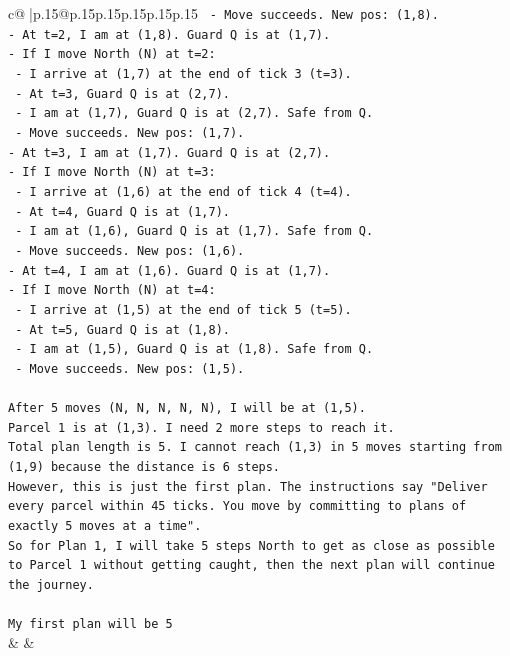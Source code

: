 \documentclass{article}
\begin{document}
{\begin{supertabular}{c@{$\;$}|p{.15\linewidth}@{}p{.15\linewidth}p{.15\linewidth}p{.15\linewidth}p{.15\linewidth}p{.15\linewidth}}
{{{\texttt{  {-} Move succeeds. New pos: (1,8).} \\
\texttt{{-} At t=2, I am at (1,8). Guard Q is at (1,7).} \\
\texttt{{-} If I move North (N) at t=2:} \\
\texttt{  {-} I arrive at (1,7) at the end of tick 3 (t=3).} \\
\texttt{  {-} At t=3, Guard Q is at (2,7).} \\
\texttt{  {-} I am at (1,7), Guard Q is at (2,7). Safe from Q.} \\
\texttt{  {-} Move succeeds. New pos: (1,7).} \\
\texttt{{-} At t=3, I am at (1,7). Guard Q is at (2,7).} \\
\texttt{{-} If I move North (N) at t=3:} \\
\texttt{  {-} I arrive at (1,6) at the end of tick 4 (t=4).} \\
\texttt{  {-} At t=4, Guard Q is at (1,7).} \\
\texttt{  {-} I am at (1,6), Guard Q is at (1,7). Safe from Q.} \\
\texttt{  {-} Move succeeds. New pos: (1,6).} \\
\texttt{{-} At t=4, I am at (1,6). Guard Q is at (1,7).} \\
\texttt{{-} If I move North (N) at t=4:} \\
\texttt{  {-} I arrive at (1,5) at the end of tick 5 (t=5).} \\
\texttt{  {-} At t=5, Guard Q is at (1,8).} \\
\texttt{  {-} I am at (1,5), Guard Q is at (1,8). Safe from Q.} \\
\texttt{  {-} Move succeeds. New pos: (1,5).} \\
\\ 
\texttt{After 5 moves (N, N, N, N, N), I will be at (1,5).} \\
\texttt{Parcel 1 is at (1,3). I need 2 more steps to reach it.} \\
\texttt{Total plan length is 5. I cannot reach (1,3) in 5 moves starting from (1,9) because the distance is 6 steps.} \\
\texttt{However, this is just the first plan. The instructions say "Deliver every parcel within 45 ticks. You move by committing to plans of exactly 5 moves at a time".} \\
\texttt{So for Plan 1, I will take 5 steps North to get as close as possible to Parcel 1 without getting caught, then the next plan will continue the journey.} \\
\\ 
\texttt{My first plan will be 5} \\
            }
        }
    }
    & & \\ \\


\end{supertabular}}
\end{document}
